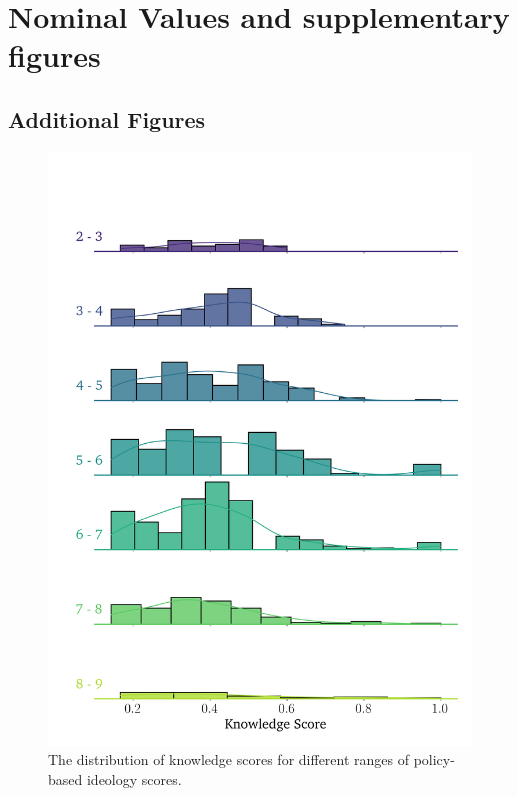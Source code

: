 \chapter{Nominal Values and supplementary figures}

\label{AppendixB}


\section{Additional Figures}
\begin{figure}
	\begin{center}
		\includegraphics[width=.8\textwidth]{Figures/knowledge_pbs_dist.png}
	\end{center}
	\caption{The distribution of knowledge scores for different ranges of policy-based ideology scores.}\label{fig:knowledge_pbs}
\end{figure}

